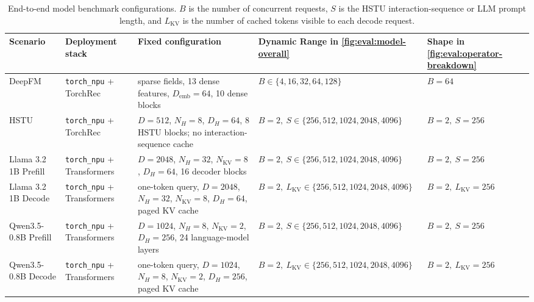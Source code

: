 \begin{table}[t]
    \centering
    \caption{End-to-end model benchmark configurations. $B$ is the number of concurrent requests, $S$ is the HSTU interaction-sequence or LLM prompt length, and $L_{\mathrm{KV}}$ is the number of cached tokens visible to each decode request.}
    \label{tab:eval:model-configs}
    \scriptsize
    \setlength{\tabcolsep}{3pt}
    \renewcommand{\arraystretch}{0.92}
    \begin{tabularx}{\textwidth}{@{}
        >{\raggedright\arraybackslash}p{}
        >{\raggedright\arraybackslash}p{}
        >{\raggedright\arraybackslash}X
        >{\raggedright\arraybackslash}p{}
        >{\raggedright\arraybackslash}p{}
        @{}}
        \toprule
        \textbf{Scenario} & \textbf{Deployment stack} & \textbf{Fixed configuration} & \textbf{Dynamic Range in \autoref{fig:eval:model-overall}} & \textbf{Shape in \autoref{fig:eval:operator-breakdown}} \\
        \midrule
        DeepFM &
        \texttt{torch\_npu} + TorchRec &
        20 sparse fields, 13 dense features, $D_{\mathrm{emb}}=64$, 10 dense blocks &
        $B\in\{4,16,32,64,128\}$ &
        $B=64$ \\
        HSTU &
        \texttt{torch\_npu} + TorchRec &
        $D=512$, $N_H=8$, $D_H=64$, 8 HSTU blocks; no interaction-sequence cache &
        $B=2,\ S\in\{256,512,1024,2048,4096\}$ &
        $B=2,\ S=256$ \\
        Llama 3.2 1B Prefill &
        \texttt{torch\_npu} + Transformers &
        $D=2048$, $N_H=32$, $N_{\mathrm{KV}}=8$, $D_H=64$, 16 decoder blocks &
        $B=2,\ S\in\{256,512,1024,2048,4096\}$ &
        $B=2,\ S=256$ \\
        Llama 3.2 1B Decode &
        \texttt{torch\_npu} + Transformers &
        one-token query, $D=2048$, $N_H=32$, $N_{\mathrm{KV}}=8$, $D_H=64$, paged KV cache &
        $B=2,\ L_{\mathrm{KV}}\in\{256,512,1024,2048,4096\}$ &
        $B=2,\ L_{\mathrm{KV}}=256$ \\
        Qwen3.5-0.8B Prefill &
        \texttt{torch\_npu} + Transformers &
        $D=1024$, $N_H=8$, $N_{\mathrm{KV}}=2$, $D_H=256$, 24 language-model layers &
        $B=2,\ S\in\{256,512,1024,2048,4096\}$ &
        $B=2,\ S=256$ \\
        Qwen3.5-0.8B Decode &
        \texttt{torch\_npu} + Transformers &
        one-token query, $D=1024$, $N_H=8$, $N_{\mathrm{KV}}=2$, $D_H=256$, paged KV cache &
        $B=2,\ L_{\mathrm{KV}}\in\{256,512,1024,2048,4096\}$ &
        $B=2,\ L_{\mathrm{KV}}=256$ \\
        \bottomrule
    \end{tabularx}
\end{table}
